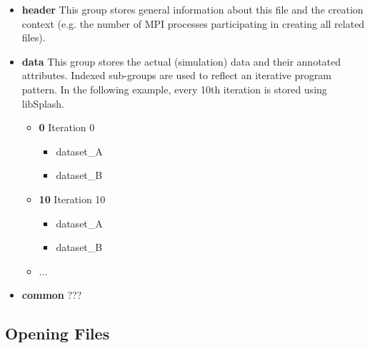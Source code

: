 \documentclass[a4paper,10pt,BCOR12mm]{report}
\begin{document}
\begin{itemize}
	\item \textbf{header}
	This group stores general information about this file and the creation context (e.g.
	the number of MPI processes participating in creating all related files).

	\item \textbf{data}
	This group stores the actual (simulation) data and their annotated attributes. Indexed
	sub-groups are used to reflect an iterative program pattern. In the following example, every 10th
	iteration is stored using libSplash.
	\begin{itemize}
		\item \textbf{0}
		Iteration 0
		\begin{itemize}
			\item dataset\_A
			\item dataset\_B
		\end{itemize}

		\item \textbf{10}
		Iteration 10
		\begin{itemize}
			\item dataset\_A
			\item dataset\_B
		\end{itemize}

		\item ...
	\end{itemize}

	\item \textbf{common}
	???
\end{itemize}


\subsection{Opening Files}
\end{document}
